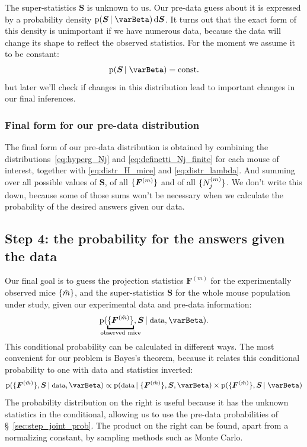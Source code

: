 \documentclass[\ifafour a4paper,12pt,\else a5paper,10pt,\fi%
onecolumn,oneside,article,%
british%
]{memoir}
\theoremstyle{remark}
\theoremstyle{innote}
\newcommand*{\di}{\mathrm{d}}%
\newcommand*{\pf}{\mathrm{p}}%
\renewcommand*{\|}[1][]{\nonscript\,#1\vert\nonscript\;\mathopen{}}
\newcommand*{\sect}{\S}%
\newcommand*{\yI}{\varBeta}
\newcommand*{\yF}{\bm{F}}
\newcommand*{\yFm}[1][m]{\yF^{(#1)}}
\newcommand*{\yNm}[1][m]{N^{(#1)}}
\newcommand*{\ySS}{S}
\newcommand*{\yS}{\bm{\ySS}}
\DeclarePairedDelimiter\tu{\{}{\}}
\newcommand*{\ymh}{\Hat{m}}
\begin{document}
The super-statistics $\yS$ is unknown to us. Our pre-data guess about it is
expressed by a probability density $\pf(\yS \| \yI)\,\di\yS$. It turns out
that the exact form of this density is unimportant if we have numerous
data, because the data will change its shape to reflect the observed
statistics. For the moment we assume it to be constant:
\begin{equation}
  \label{eq:distr_lambda}
  \pf(\yS \| \yI) = \text{const.}
\end{equation}
but later we'll check if changes in this distribution lead to important
changes in our final inferences.

\subsubsection{Final form for our pre-data distribution}
\label{sec:final_predata}

The final form of our pre-data distribution is obtained by combining the
distributions~\eqref{eq:hyperg_Nj} and \eqref{eq:definetti_Nj_finite} for
each mouse of interest, together with \eqref{eq:distr_H_mice} and
\eqref{eq:distr_lambda}. And summing over all possible values of $\yS$, of
all $\tu{\yFm}$ and of all $\tu{\yNm_{j}}$. We don't write this down,
because some of those sums won't be necessary when we calculate the
probability of the desired answers given our data.

\subsection{Step 4: the probability for the answers given the data}
\label{sec:step4_answer_from_data}

Our final goal is to guess the projection statistics $\yFm$ for the
experimentally observed mice $\tu{\ymh}$, and the super-statistics $\yS$
for the whole mouse population under study, given our experimental data and
pre-data information:
\begin{equation}
  \label{eq:guess_given_data}
  \pf(\underbracket{\tu{\yFm[\ymh]}}_{\mathclap{\text{observed mice}}}, \yS
  \| \text{\small data}, \yI).
\end{equation}
This conditional probability can be calculated in different ways. The most
convenient for our problem is Bayes's theorem, because it relates this
conditional probability to one with data and statistics inverted:
\begin{equation}
  \label{eq:bayes_data_answers}
  \pf(\tu{\yFm[\ymh]}, \yS
  \| \text{\small data}, \yI)
  \propto
  \pf( \text{\small data} \|
  \tu{\yFm[\ymh]}, \yS, \yI)
  \times \pf( \tu{\yFm[\ymh]}, \yS \| \yI)
\end{equation}
The probability distribution on the right is useful because it has the
unknown statistics in the conditional, allowing us to use the pre-data
probabilities of \sect~\ref{sec:step_joint_prob}. The product on the right
can be found, apart from a normalizing constant, by sampling methods such
as Monte Carlo.
\end{document}

